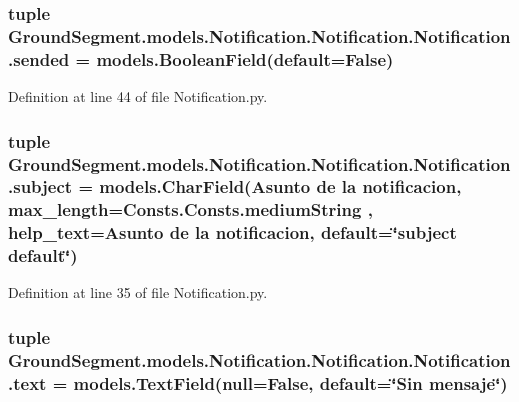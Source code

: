 \subsubsection[{sended}]{\setlength{\rightskip}{0pt plus 5cm}tuple Ground\+Segment.\+models.\+Notification.\+Notification.\+Notification.\+sended = models.\+Boolean\+Field(default=False)\hspace{0.3cm}{\ttfamily [static]}}\label{class_ground_segment_1_1models_1_1_notification_1_1_notification_1_1_notification_aec220ade3819946a0fb450d03e5ef97c}


Definition at line 44 of file Notification.\+py.

\hypertarget{class_ground_segment_1_1models_1_1_notification_1_1_notification_1_1_notification_a5d4145d0ba4943ac10e0a269ea3ae54e}{}
\subsubsection[{subject}]{\setlength{\rightskip}{0pt plus 5cm}tuple Ground\+Segment.\+models.\+Notification.\+Notification.\+Notification.\+subject = models.\+Char\+Field(\textquotesingle{}Asunto de la notificacion\textquotesingle{}, max\+\_\+length={\bf Consts.\+Consts.\+medium\+String} , help\+\_\+text=\textquotesingle{}Asunto de la notificacion\textquotesingle{}, default=\char`\"{}subject default\char`\"{})\hspace{0.3cm}{\ttfamily [static]}}\label{class_ground_segment_1_1models_1_1_notification_1_1_notification_1_1_notification_a5d4145d0ba4943ac10e0a269ea3ae54e}


Definition at line 35 of file Notification.\+py.

\hypertarget{class_ground_segment_1_1models_1_1_notification_1_1_notification_1_1_notification_aab87e972d1da9172d2e7cce622b8fce3}{}
\subsubsection[{text}]{\setlength{\rightskip}{0pt plus 5cm}tuple Ground\+Segment.\+models.\+Notification.\+Notification.\+Notification.\+text = models.\+Text\+Field(null=False, default=\char`\"{}Sin mensaje\char`\"{})\hspace{0.3cm}{\ttfamily [static]}}\label{class_ground_segment_1_1models_1_1_notification_1_1_notification_1_1_notification_aab87e972d1da9172d2e7cce622b8fce3}


